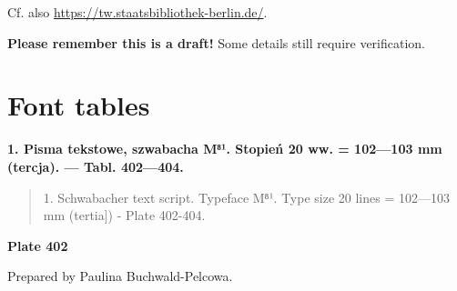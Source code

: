 \documentclass[12pt]{article}
\begin{document}
\noindent
Cf. also \url{https://tw.staatsbibliothek-berlin.de/}.

\bigskip \textbf{Please remember this is a draft!} Some details still
require verification.

\newpage
\section{Font tables}
\label{sec:font-tables}





\textbf{1. Pisma tekstowe, szwabacha M⁸¹. Stopień 20 ww. = 102—103 mm (tercja). — Tabl. 402—404.}


\begin{quote}
  1. Schwabacher text script. Typeface M⁸¹. Type size 20 lines = 102—103
  mm (tertia]) - Plate 402-404.
\end{quote}


  
    \medskip

    \textbf{Plate 402} 
    
    Prepared by Paulina Buchwald-Pelcowa.

    \medskip
    
\end{document}
